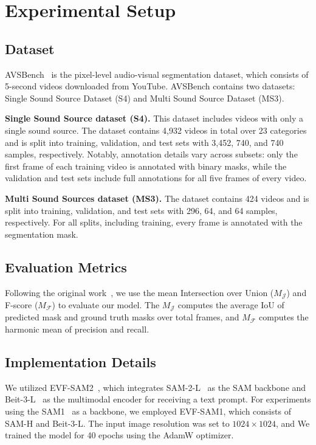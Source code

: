\section{Experimental Setup}
\subsection{Dataset}

AVSBench~\cite{zhou2022avs} is the pixel-level audio-visual segmentation dataset, which consists of 5-second videos downloaded from YouTube. AVSBench contains two datasets: Single Sound Source Dataset (S4) and Multi Sound Source Dataset (MS3). 


\textbf{Single Sound Source dataset (S4).}
This dataset includes videos with only a single sound source. The dataset contains 4,932 videos in total over 23 categories and is split into training, validation, and test sets with 3,452, 740, and 740 samples, respectively. 
Notably, annotation details vary across subsets: only the first frame of each training video is annotated with binary masks, while the validation and test sets include full annotations for all five frames of every video.

\textbf{Multi Sound Sources dataset (MS3).}
The dataset contains 424 videos and is split into training, validation, and test sets with 296, 64, and 64 samples, respectively. For all splits, including training, every frame is annotated with the segmentation mask.

\subsection{Evaluation Metrics}
Following the original work~\cite{zhou2022avs}, we use the mean Intersection over Union ($M_{\mathcal{J}}$) and F-score ($M_{\mathcal{F}}$) to evaluate our model. The $M_{\mathcal{J}}$ computes the average IoU of predicted mask and ground truth masks over total frames, and $M_{\mathcal{F}}$ computes the harmonic mean of precision and recall.

\subsection{Implementation Details}
We utilized EVF-SAM2~\cite{zhang2024evfsam}, which integrates SAM-2-L~\cite{ravi2024sam2} as the SAM backbone and Beit-3-L~\cite{wang2022beit3} as the multimodal encoder for receiving a text prompt. For experiments using the SAM1~\cite{kirillov2023sam} as a backbone, we employed EVF-SAM1, which consists of SAM-H and Beit-3-L. The input image resolution was set to $1024 \times 1024$, and We trained the model for 40 epochs using the AdamW optimizer.